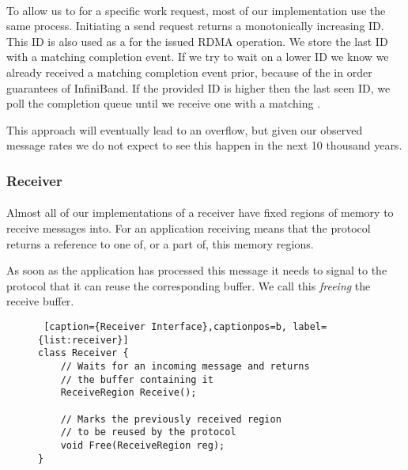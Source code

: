 \paragraph{} To allow us to  for a specific work request, most of our implementation use the same process. 
Initiating a send request returns a monotonically increasing ID. This ID is also used as a  for the issued RDMA
operation. We store the last ID with a matching completion event. If we try to wait on a lower ID we know we already received 
a matching completion event prior, because of the in order guarantees of InfiniBand. If the provided ID is higher then the
last seen ID, we poll the completion queue until we receive one with a matching .

This approach will eventually lead to an overflow, but given our observed  message rates we do not expect to see this 
happen in the next 10 thousand years. 

\subsubsection{Receiver}

\paragraph{} Almost all of our implementations of a receiver have fixed regions of memory to receive messages into. 
For an application receiving means that the protocol returns a reference to one of, or a part of, this memory regions. 

As soon as the application  has processed this message it needs to signal to the protocol that it can reuse the corresponding
buffer. We call this \emph{freeing} the receive buffer.

\begin{figure}[htp]
\begin{lstlisting} [caption={Receiver Interface},captionpos=b, label={list:receiver}] 
class Receiver {
    // Waits for an incoming message and returns
    // the buffer containing it
    ReceiveRegion Receive();

    // Marks the previously received region 
    // to be reused by the protocol
    void Free(ReceiveRegion reg);
}
\end{lstlisting}
\end{figure}






